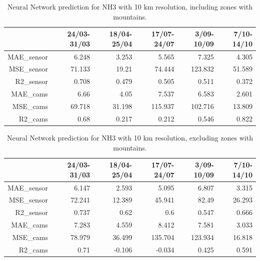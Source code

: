 \begin{table}[H]
\begin{tabular}{rrrrrr}
\hline
    &   24/03-31/03 &   18/04-25/04 &   17/07-24/07 &   3/09-10/09 &   7/10-14/10 \\
\hline
  MAE\_sensor   &            6.248 &            3.253 &            5.565 &            7.325 &            4.305 \\
  MSE\_sensor   &           71.133 &           19.21  &           74.444 &          123.832 &           51.589 \\
  R2\_sensor    &            0.708 &            0.479 &            0.505 &            0.511 &            0.372 \\
  MAE\_cams     &            6.66  &            4.05  &            7.537 &            6.583 &            2.601 \\
 MSE\_cams     &           69.718 &           31.198 &          115.937 &          102.716 &           13.809 \\
  R2\_cams      &            0.68  &            0.217 &            0.212 &            0.546 &            0.822 \\
\hline
\end{tabular}
\caption{Neural Network prediction for NH3 with 10 km resolution, including zones with mountains.}
\end{table}

\begin{table}[H]
\begin{tabular}{rrrrrr}
\hline
    &   24/03-31/03 &   18/04-25/04 &   17/07-24/07 &   3/09-10/09 &   7/10-14/10 \\
\hline
   MAE\_sensor   &            6.147 &            2.593 &            5.095 &            6.807 &            3.315 \\
  MSE\_sensor   &           72.241 &           12.389 &           45.941 &           82.49  &           26.293 \\
  R2\_sensor    &            0.737 &            0.62  &            0.6   &            0.547 &            0.666 \\
  MAE\_cams     &            7.283 &            4.559 &            8.412 &            7.581 &            3.033 \\
  MSE\_cams     &           78.979 &           36.499 &          135.704 &          123.934 &           16.818 \\
  R2\_cams      &            0.71  &           -0.106 &           -0.034 &            0.425 &            0.591 \\
\hline
\end{tabular}
\caption{Neural Network prediction for NH3 with 10 km resolution, excluding zones with mountains.}
\end{table}

